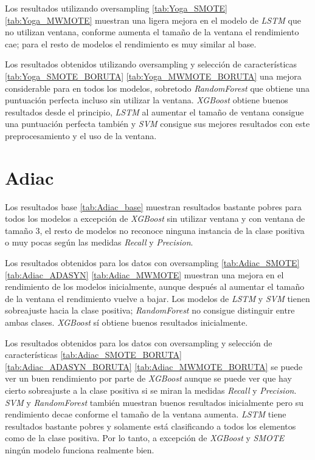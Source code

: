Los resultados utilizando oversampling \ref{tab:Yoga_SMOTE} \ref{tab:Yoga_MWMOTE} muestran una ligera mejora en el modelo de \textit{LSTM} que no utilizan ventana, conforme aumenta el tamaño de la ventana el rendimiento cae; para el resto de modelos el rendimiento es muy similar al base.\newline

Los resultados obtenidos utilizando oversampling y selección de características \ref{tab:Yoga_SMOTE_BORUTA} \ref{tab:Yoga_MWMOTE_BORUTA} una mejora considerable para en todos los modelos, sobretodo \textit{RandomForest} que obtiene una puntuación perfecta incluso sin utilizar la ventana. \textit{XGBoost} obtiene buenos resultados desde el principio, \textit{LSTM} al aumentar el tamaño de ventana consigue una puntuación perfecta también y \textit{SVM} consigue sus mejores resultados con este preprocesamiento y el uso de la ventana.

\section{Adiac}

Los resultados base \ref{tab:Adiac_base} muestran resultados bastante pobres para todos los modelos a excepción de \textit{XGBoost} sin utilizar ventana y con ventana de tamaño 3, el resto de modelos no reconoce ninguna instancia de la clase positiva o muy pocas según las medidas \textit{Recall} y \textit{Precision}.\newline

Los resultados obtenidos para los datos con oversampling \ref{tab:Adiac_SMOTE}  \ref{tab:Adiac_ADASYN} \ref{tab:Adiac_MWMOTE} muestran una mejora en el rendimiento de los modelos inicialmente, aunque después al aumentar el tamaño de la ventana el rendimiento vuelve a bajar. Los modelos de \textit{LSTM} y \textit{SVM} tienen sobreajuste hacia la clase positiva; \textit{RandomForest} no consigue distinguir entre ambas clases. \textit{XGBoost} sí obtiene buenos resultados inicialmente.\newline

Los resultados obtenidos para los datos con oversampling y selección de características \ref{tab:Adiac_SMOTE_BORUTA} \ref{tab:Adiac_ADASYN_BORUTA} \ref{tab:Adiac_MWMOTE_BORUTA} se puede ver un buen rendimiento por parte de \textit{XGBoost} aunque se puede ver que hay cierto sobreajuste a la clase positiva si se miran la medidas \textit{Recall} y \textit{Precision}. \textit{SVM} y \textit{RandomForest} también muestran buenos resultados inicialmente pero su rendimiento decae conforme el tamaño de la ventana aumenta. \textit{LSTM} tiene resultados bastante pobres y solamente está clasificando a todos los elementos como de la clase positiva. Por lo tanto, a excepción de \textit{XGBoost} y \textit{SMOTE} ningún modelo funciona realmente bien.


